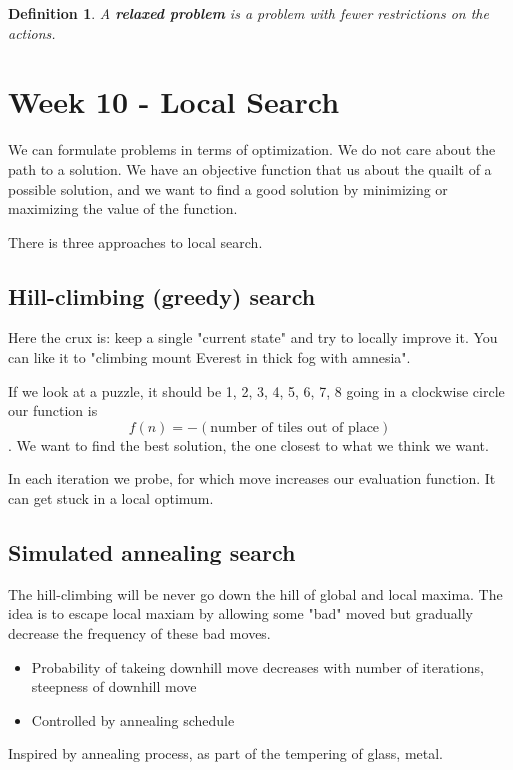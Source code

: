 \documentclass{article}
\newtheorem{definition}{Definition}[section]
\begin{document}
\begin{definition}
A \textbf{relaxed problem} is a problem with fewer restrictions on the actions.
\end{definition}



\newpage
\section{Week 10 - Local Search}
We can formulate problems in terms of optimization. We do not care about the
path to a solution. We have an objective function that us about the quailt of a
possible solution, and we want to find a good solution by minimizing or
maximizing the value of the function.

There is three approaches to local search.

\subsection{Hill-climbing (greedy) search}
Here the crux is: keep a single "current state" and try to locally improve it.
You can like it to "climbing mount Everest in thick fog with amnesia".

If we look at a puzzle, it should be 1, 2, 3, 4, 5, 6, 7, 8 going in a clockwise
circle our function is $$f(n) = -(\text{number of tiles out of place})$$.
We want to find the best solution, the one closest to what we think we want.

In each iteration we probe, for which move increases our evaluation function.
It can get stuck in a local optimum.

\subsection{Simulated annealing search}
The hill-climbing will be never go down the hill of global and local maxima. 
The idea is to escape local maxiam by allowing some "bad" moved but gradually
decrease the frequency of these bad moves.
\begin{itemize}
  \item Probability of takeing downhill move decreases with number of
    iterations, steepness of downhill move
  \item Controlled by annealing schedule 
\end{itemize}
Inspired by annealing process, as part of the tempering of glass, metal.



\newpage
\end{document}
